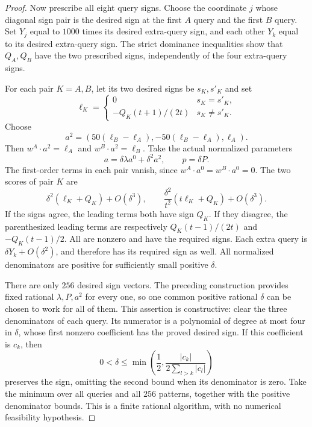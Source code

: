 \documentclass[11pt]{article}
\begin{document}
\begin{proof}
Now prescribe all eight query signs. Choose the coordinate $j$ whose
diagonal sign pair is the desired sign at the first $A$ query and the
first $B$ query. Set $Y_j$ equal to $1000$ times its desired extra-query
sign, and each other $Y_k$ equal to its desired extra-query sign.
The strict dominance inequalities show that $Q_A,Q_B$ have the two
prescribed signs, independently of the four extra-query signs.

For each pair $K=A,B$, let its two desired signs be $s_K,s'_K$ and set
\[
 \ell_K=\begin{cases}
 0&s_K=s'_K,\\
 -Q_K(t+1)/(2t)&s_K\ne s'_K.
 \end{cases}
\]
Choose
\[
 a^2=(50(\ell_B-\ell_A),-50(\ell_B-\ell_A),\ell_A).
\]
Then $w^A\cdot a^2=\ell_A$ and $w^B\cdot a^2=\ell_B$.
Take the actual normalized parameters
\[
 a=\delta\lambda a^0+\delta^2a^2,\qquad p=\delta P.
\]
The first-order terms in each pair vanish, since
$w^A\cdot a^0=w^B\cdot a^0=0$. The two scores of pair $K$ are
\[
 \delta^2(\ell_K+Q_K)+O(\delta^3),\qquad
 \frac{\delta^2}{t^2}(t\ell_K+Q_K)+O(\delta^3).
\]
If the signs agree, the leading terms both have sign $Q_K$.
If they disagree, the parenthesized leading terms are respectively
$Q_K(t-1)/(2t)$ and $-Q_K(t-1)/2$. All are nonzero and have the
required signs. Each extra query is $\delta Y_k+O(\delta^2)$,
and therefore has its required sign as well. All normalized denominators
are positive for sufficiently small positive $\delta$.

There are only $256$ desired sign vectors. The preceding construction
provides fixed rational $\lambda,P,a^2$ for every one, so one common
positive rational $\delta$ can be chosen to work for all of them.
This assertion is constructive: clear the three denominators of each
query. Its numerator is a polynomial of degree at most four in $\delta$,
whose first nonzero coefficient has the proved desired sign. If this
coefficient is $c_k$, then
\[
0<\delta\leq\min\left(\frac12,
 \frac{|c_k|}{2\sum_{l>k}|c_l|}\right)
\]
preserves the sign, omitting the second bound when its denominator is
zero. Take the minimum over all queries and all $256$ patterns, together
with the positive denominator bounds. This is a finite rational
algorithm, with no numerical feasibility hypothesis.


\end{proof}
\end{document}
